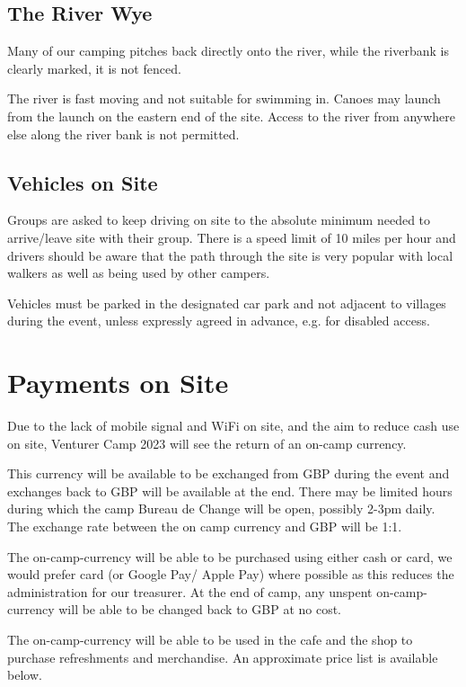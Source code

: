 \documentclass[a4paper, 11pt]{report}
\newcommand{\nl}{\newline}
\begin{document}
\section{The River Wye}
Many of our camping pitches back directly onto the river, while the riverbank is clearly marked, it is not fenced. \nl

The river is fast moving and not suitable for swimming in. Canoes may launch from the launch on the eastern end of the site. Access to the river from anywhere else along the river bank is not permitted. 

\section{Vehicles on Site}
Groups are asked to keep driving on site to the absolute minimum needed to arrive/leave site with their group.  There is a speed limit of 10 miles per hour and drivers should be aware that the path through the site is very popular with local walkers as well as being used by other campers.\nl

Vehicles must be parked in the designated car park and not adjacent to villages during the event, unless expressly agreed in advance, e.g. for disabled access.

\chapter{Payments on Site}
Due to the lack of mobile signal and WiFi on site, and the aim to reduce cash use on site, Venturer Camp 2023 will see the return of an on-camp currency.\nl

This currency will be available to be exchanged from GBP during the event and exchanges back to GBP will be available at the end. There may be limited hours during which the camp Bureau de Change will be open, possibly 2-3pm daily. The exchange rate between the on camp currency and GBP will be 1:1. \nl

The on-camp-currency will be able to be purchased using either cash or card, we would prefer card (or Google Pay/ Apple Pay) where possible as this reduces the administration for our treasurer. At the end of camp, any unspent on-camp-currency will be able to be changed back to GBP at no cost. \nl

The on-camp-currency will be able to be used in the cafe and the shop to purchase refreshments and merchandise. An approximate price list is available below.
\end{document}
